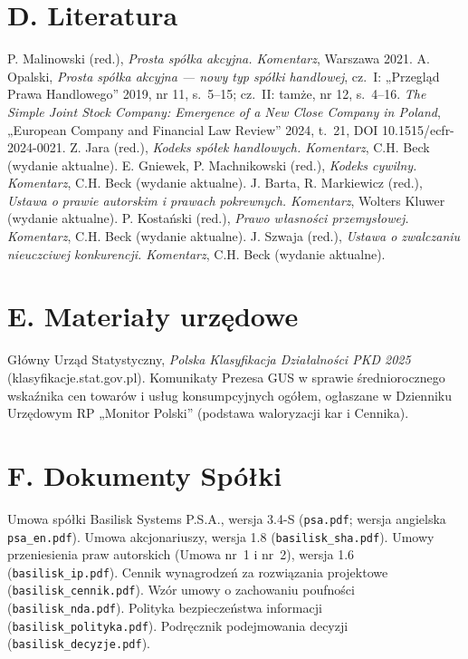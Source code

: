 \section*{D. Literatura}
\begin{BibList}
 P. Malinowski (red.), \emph{Prosta spółka akcyjna. Komentarz}, Warszawa 2021.
 A. Opalski, \emph{Prosta spółka akcyjna --- nowy typ spółki handlowej}, cz.~I: „Przegląd Prawa Handlowego” 2019, nr 11, s.~5--15; cz.~II: tamże, nr 12, s.~4--16.
 \emph{The Simple Joint Stock Company: Emergence of a New Close Company in Poland}, „European Company and Financial Law Review” 2024, t.~21, DOI 10.1515/ecfr-2024-0021.
 Z. Jara (red.), \emph{Kodeks spółek handlowych. Komentarz}, C.H. Beck (wydanie aktualne).
 E. Gniewek, P. Machnikowski (red.), \emph{Kodeks cywilny. Komentarz}, C.H. Beck (wydanie aktualne).
 J. Barta, R. Markiewicz (red.), \emph{Ustawa o prawie autorskim i prawach pokrewnych. Komentarz}, Wolters Kluwer (wydanie aktualne).
 P. Kostański (red.), \emph{Prawo własności przemysłowej. Komentarz}, C.H. Beck (wydanie aktualne).
 J. Szwaja (red.), \emph{Ustawa o zwalczaniu nieuczciwej konkurencji. Komentarz}, C.H. Beck (wydanie aktualne).
\end{BibList}

\section*{E. Materiały urzędowe}
\begin{BibList}
 Główny Urząd Statystyczny, \emph{Polska Klasyfikacja Działalności PKD 2025} (klasyfikacje.stat.gov.pl).
 Komunikaty Prezesa GUS w sprawie średniorocznego wskaźnika cen towarów i usług konsumpcyjnych ogółem, ogłaszane w Dzienniku Urzędowym RP „Monitor Polski” (podstawa waloryzacji kar i Cennika).
\end{BibList}

\section*{F. Dokumenty Spółki}
\begin{BibList}
 Umowa spółki Basilisk Systems P.S.A., wersja 3.4-S (\texttt{psa.pdf}; wersja angielska \texttt{psa\_en.pdf}).
 Umowa akcjonariuszy, wersja 1.8 (\texttt{basilisk\_sha.pdf}).
 Umowy przeniesienia praw autorskich (Umowa nr~1 i nr~2), wersja 1.6 (\texttt{basilisk\_ip.pdf}).
 Cennik wynagrodzeń za rozwiązania projektowe (\texttt{basilisk\_cennik.pdf}).
 Wzór umowy o zachowaniu poufności (\texttt{basilisk\_nda.pdf}).
 Polityka bezpieczeństwa informacji (\texttt{basilisk\_polityka.pdf}).
 Podręcznik podejmowania decyzji (\texttt{basilisk\_decyzje.pdf}).
\end{BibList}
